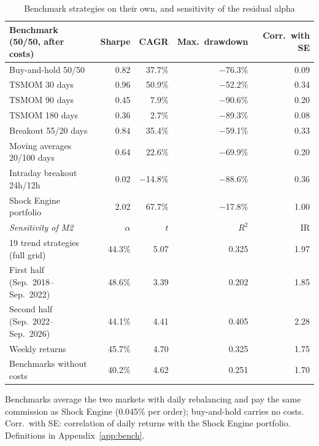 \documentclass[11pt,a4paper]{article}
\newcommand{\1}{\mathbf{1}}
\begin{document}
\begin{table}[tbp]
\centering\small
\begin{threeparttable}
\caption{Benchmark strategies on their own, and sensitivity of the residual alpha}\label{tab:bench}
\begin{tabular}{lrrrr}
\toprule
Benchmark (50/50, after costs) & Sharpe & CAGR & Max.~drawdown & Corr.~with SE \\
\midrule
Buy-and-hold 50/50 & 0.82 & 37.7\% & \ensuremath{-}76.3\% & 0.09 \\
TSMOM 30 days & 0.96 & 50.9\% & \ensuremath{-}52.2\% & 0.34 \\
TSMOM 90 days & 0.45 & 7.9\% & \ensuremath{-}90.6\% & 0.20 \\
TSMOM 180 days & 0.36 & 2.7\% & \ensuremath{-}89.3\% & 0.08 \\
Breakout 55/20 days & 0.84 & 35.4\% & \ensuremath{-}59.1\% & 0.33 \\
Moving averages 20/100 days & 0.64 & 22.6\% & \ensuremath{-}69.9\% & 0.20 \\
Intraday breakout 24h/12h & 0.02 & \ensuremath{-}14.8\% & \ensuremath{-}88.6\% & 0.36 \\
Shock Engine portfolio & 2.02 & 67.7\% & \ensuremath{-}17.8\% & 1.00 \\
\midrule
\textit{Sensitivity of M2} & $\alpha$ & $t$ & $R^2$ & IR \\
\midrule
19 trend strategies (full grid) & 44.3\% & 5.07 & 0.325 & 1.97 \\
First half (Sep.~2018--Sep.~2022) & 48.6\% & 3.39 & 0.202 & 1.85 \\
Second half (Sep.~2022--Sep.~2026) & 44.1\% & 4.41 & 0.405 & 2.28 \\
Weekly returns & 45.7\% & 4.70 & 0.325 & 1.75 \\
Benchmarks without costs & 40.2\% & 4.62 & 0.251 & 1.70 \\
\bottomrule
\end{tabular}
\begin{tablenotes}[flushleft]\footnotesize
\item Benchmarks average the two markets with daily rebalancing and pay the same commission as Shock Engine (0.045\% per order); buy-and-hold carries no costs. Corr.~with SE: correlation of daily returns with the Shock Engine portfolio. Definitions in Appendix~\ref{app:bench}.
\end{tablenotes}
\end{threeparttable}
\end{table}
\end{document}
